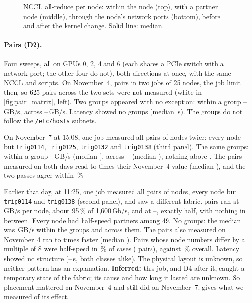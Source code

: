 \begin{figure}[h]
  \centering{}
  \caption{NCCL all-reduce per node: within the node (top), with a partner node (middle), through the node's network ports (bottom), before and after the kernel change. Solid line: median. }
  \label{fig:health_links}
\end{figure}

\paragraph{Pairs (D2).} Four sweeps, all on GPUs 0, 2, 4 and 6 (each shares a PCIe switch with a network port; the other four do not), both directions at once, with the same NCCL and scripts. On November~4, \TriPairsMeasured{} pairs in two jobs of 25 nodes, the job limit then, so 625 pairs across the two sets were not measured (white in \cref{fig:pair_matrix}, left). Two groups appeared with no exception: within a group \TriPairWithinLo--\TriPairWithinHi\,GB/s, across \TriPairAcrossLo--\TriPairAcrossHi\,GB/s. Latency showed no groups (median \TriPairLat\,\textmu s). The groups do not follow the \texttt{/etc/hosts} subnets.

On November~7 at 15:08, one job measured all \TriAgainPairs{} pairs of \TriAgainNodes{} nodes twice: every node but \texttt{trig0114}, \texttt{trig0125}, \texttt{trig0132} and \texttt{trig0138} (third panel). The same groups: within a group \TriAgainWithinLo--\TriAgainWithinHi\,GB/s (median \TriAgainWithin), across \TriAgainAcrossLo--\TriAgainAcrossHi{} (median \TriAgainAcross), nothing above \TriAgainMax. The \TriAgainCommon{} pairs measured on both days read \TriAgainRatioLo{} to \TriAgainRatioHi{} times their November~4 value (median \TriAgainRatioMed), and the two passes agree within \TriAgainPassPct\,\%.

Earlier that day, at 11:25, one job measured all \TriFullPairs{} pairs of \TriFullNodes{} nodes, every node but \texttt{trig0114} and \texttt{trig0138} (second panel), and saw a different fabric. \TriFullFast{} pairs ran at \TriFullFastLo--\TriFullFastHi\,GB/s per node, about 95\,\% of 1,600\,Gb/s, and \TriFullSlow{} at \TriFullSlowLo--\TriFullSlowHi, exactly half, with nothing in between. Every node had \TriFullPartnersLo{} half-speed partners among 49. No groups: the median was \TriFullWithin\,GB/s within the groups and \TriFullAcross{} across them. The \TriFullCommon{} pairs also measured on November~4 ran \TriFullRatioLo{} to \TriFullRatioHi{} times faster (median \TriFullRatioMed). Pairs whose node numbers differ by a multiple of 8 were half-speed in \TriFullEightPct\,\% of cases (\TriFullEightPairs{} pairs), against \TriFullSlowPct\,\% overall. Latency showed no structure (\TriFullLatLo--\TriFullLatHi\,\textmu s, both classes alike). The physical layout is unknown, so neither pattern has an explanation. \textbf{Inferred:} this job, and D4 after it, caught a temporary state of the fabric; its cause and how long it lasted are unknown.
So placement mattered on November~4 and still did on November~7.  gives what we measured of its effect.

